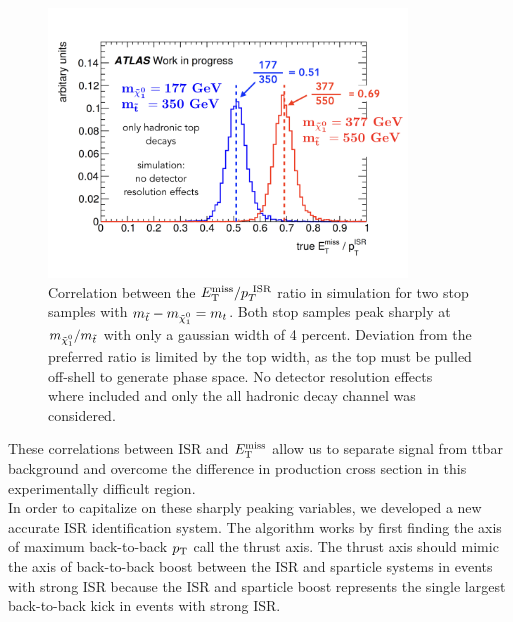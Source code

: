 \begin{figure}[h!]
\centering
    \includegraphics[width=0.85\textwidth]{figures/strategy/RISR_truth.png}\hspace{0.05\textwidth}
\caption[Correlation between the $\met/\PTISR$ ratio in simulation for stop samples with $m_{\stop}-m_{\ninoone} = m_t$]{ Correlation between the $\met/\PTISR$ ratio in simulation for two stop samples with $m_{\stop}-m_{\ninoone} = m_t$.  Both stop samples peak sharply at $m_{\ninoone}/m_{\stop}$ with only a gaussian width of 4 percent.  Deviation from the preferred ratio is limited by the top width, as the top must be pulled off-shell to generate phase space. No detector resolution effects where included and only the all hadronic decay channel was considered. }
\label{fig:trueRISR}
\end{figure}

\indent These correlations between ISR and $E_{\mathrm{T}}^{\mathrm{miss}}$ allow us to separate signal from ttbar background and overcome the difference in production cross section in this experimentally difficult region.  \\

\indent In order to capitalize on these sharply peaking variables, we developed a new accurate ISR identification system.  The algorithm works by first finding the axis of maximum back-to-back $p_{\mathrm{T}}$ call the thrust axis.  The thrust axis should mimic the axis of back-to-back boost between the ISR and sparticle systems in events with strong ISR because the ISR and sparticle boost represents the single largest back-to-back kick in events with strong ISR.  \\

